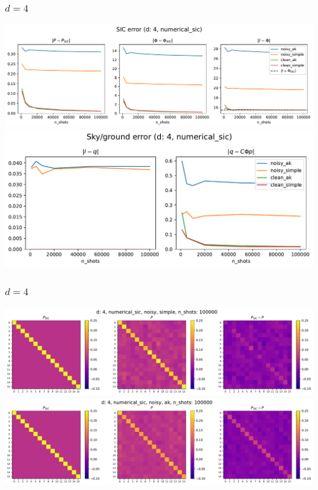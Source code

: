 \documentclass{beamer}
\begin{document}
\begin{frame}
\frametitle{$d=4$}
\begin{center}
\includegraphics[scale=0.35]{img/sic_metrics_d4_numerical_sic}
\includegraphics[scale=0.35]{img/sg_metrics_d4_numerical_sic}		
\end{center}
\end{frame}

\begin{frame}
\frametitle{$d=4$}
\begin{center}
\includegraphics[scale=0.3]{img/P_d4_numerical_sic_noisy_simple_n100000}
\includegraphics[scale=0.3]{img/P_d4_numerical_sic_noisy_ak_n100000}		
\end{center}
\end{frame}
\end{document}
